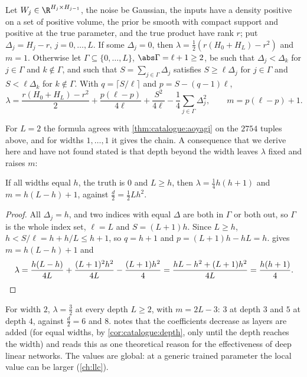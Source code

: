 \begin{refsection}
\begin{theorem}\label{thm:catalogue:deep}
Let $W_j\in\R^{H_j\times H_{j-1}}$, the noise be Gaussian, the inputs have a density positive on a set of positive volume, the prior be smooth with compact support and positive at the true parameter, and the true product have rank $r$; put $\Delta_j=H_j-r$, $j=0,\dots,L$. If some $\Delta_j=0$, then $\lambda=\frac12(r(H_0+H_L)-r^2)$ and $m=1$. Otherwise let $\Gamma\subseteq\{0,\dots,L\}$, $\abs\Gamma=\ell+1\ge2$, be such that $\Delta_j<\Delta_k$ for $j\in\Gamma$ and $k\notin\Gamma$, and such that $S=\sum_{j\in\Gamma}\Delta_j$ satisfies $S\ge\ell\Delta_j$ for $j\in\Gamma$ and $S<\ell\Delta_k$ for $k\notin\Gamma$. With $q=\lceil S/\ell\rceil$ and $p=S-(q-1)\ell$,
\[
\lambda=\frac{r(H_0+H_L)-r^2}2+\frac{p(\ell-p)}{4\ell}+\frac{S^2}{4\ell}-\frac14\sum_{j\in\Gamma}\Delta_j^2,\qquad m=p(\ell-p)+1.
\]
\end{theorem}

For $L=2$ the formula agrees with \cref{thm:catalogue:aoyagi} on the $2754$ tuples above, and for widths $1,\dots,1$ it gives the chain. A consequence that we derive here and have not found stated is that depth beyond the width leaves $\lambda$ fixed and raises $m$:

\begin{corollary}\label{cor:catalogue:depth}
If all widths equal $h$, the truth is $0$ and $L\ge h$, then $\lambda=\frac14h(h+1)$ and $m=h(L-h)+1$, against $\frac d2=\frac12Lh^2$.
\end{corollary}

\begin{proof}
All $\Delta_j=h$, and two indices with equal $\Delta$ are both in $\Gamma$ or both out, so $\Gamma$ is the whole index set, $\ell=L$ and $S=(L+1)h$. Since $L\ge h$, $h<S/\ell=h+h/L\le h+1$, so $q=h+1$ and $p=(L+1)h-hL=h$.  gives $m=h(L-h)+1$ and
\[
\lambda=\frac{h(L-h)}{4L}+\frac{(L+1)^2h^2}{4L}-\frac{(L+1)h^2}4=\frac{hL-h^2+(L+1)h^2}{4L}=\frac{h(h+1)}4.\qedhere
\]
\end{proof}

For width $2$, $\lambda=\frac32$ at every depth $L\ge2$, with $m=2L-3$: $3$ at depth $3$ and $5$ at depth $4$, against $\frac d2=6$ and $8$. \textcite{Aoyagi2025} notes that the coefficients decrease as layers are added (for equal widths, by \cref{cor:catalogue:depth}, only until the depth reaches the width) and reads this as one theoretical reason for the effectiveness of deep linear networks. The values are global: at a generic trained parameter the local value can be larger (\cref{ch:llc}).


\end{refsection}
